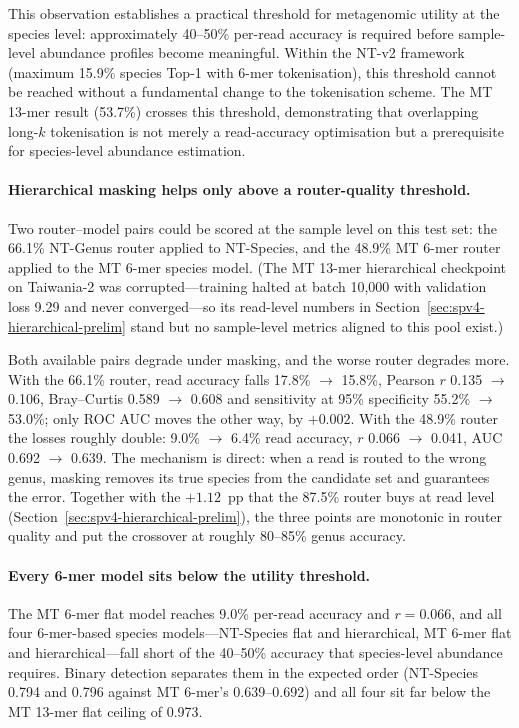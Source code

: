 This observation establishes a practical threshold for metagenomic utility at the species level: approximately 40--50\% per-read accuracy is required before sample-level abundance profiles become meaningful.
Within the NT-v2 framework (maximum 15.9\% species Top-1 with 6-mer tokenisation), this threshold cannot be reached without a fundamental change to the tokenisation scheme.
The MT 13-mer result (53.7\%) crosses this threshold, demonstrating that overlapping long-$k$ tokenisation is not merely a read-accuracy optimisation but a prerequisite for species-level abundance estimation.

\paragraph{Hierarchical masking helps only above a router-quality threshold.}
Two router--model pairs could be scored at the sample level on this test set: the
66.1\% NT-Genus router applied to NT-Species, and the 48.9\% MT 6-mer router applied
to the MT 6-mer species model. (The MT 13-mer hierarchical checkpoint on Taiwania-2
was corrupted---training halted at batch 10{,}000 with validation loss 9.29 and never
converged---so its read-level numbers in
Section~\ref{sec:spv4-hierarchical-prelim} stand but no sample-level metrics aligned
to this pool exist.)

Both available pairs degrade under masking, and the worse router degrades more. With
the 66.1\% router, read accuracy falls 17.8\% $\to$ 15.8\%, Pearson $r$ 0.135 $\to$
0.106, Bray--Curtis 0.589 $\to$ 0.608 and sensitivity at 95\% specificity 55.2\% $\to$
53.0\%; only ROC AUC moves the other way, by $+0.002$. With the 48.9\% router the
losses roughly double: 9.0\% $\to$ 6.4\% read accuracy, $r$ 0.066 $\to$ 0.041, AUC
0.692 $\to$ 0.639. The mechanism is direct: when a read is routed to the wrong genus,
masking removes its true species from the candidate set and guarantees the error.
Together with the $+1.12$~pp that the 87.5\% router buys at read level
(Section~\ref{sec:spv4-hierarchical-prelim}), the three points are monotonic in
router quality and put the crossover at roughly 80--85\% genus accuracy.

\paragraph{Every 6-mer model sits below the utility threshold.}
The MT 6-mer flat model reaches 9.0\% per-read accuracy and $r = 0.066$, and all four
6-mer-based species models---NT-Species flat and hierarchical, MT 6-mer flat and
hierarchical---fall short of the 40--50\% accuracy that species-level abundance
requires. Binary detection separates them in the expected order (NT-Species 0.794 and
0.796 against MT 6-mer's 0.639--0.692) and all four sit far below the MT 13-mer flat
ceiling of 0.973.

